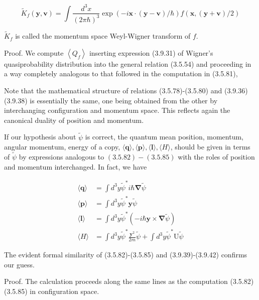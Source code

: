 \documentclass{article}
\begin{document}
\begin{equation*}
\tilde{K}_{f}(\boldsymbol{y}, \boldsymbol{v})=\int \frac{d^{3} x}{(2 \pi \hbar)^{3}} \exp (-i \boldsymbol{x} \cdot(\boldsymbol{y}-\boldsymbol{v}) / \hbar) f(\boldsymbol{x},(\boldsymbol{y}+\boldsymbol{v}) / 2) \tag{3.9.38}
\end{equation*}
 
$\tilde{K}_{f}$ is called the momentum space Weyl-Wigner transform of $f$.

Proof. We compute $\left\langle Q_{f}\right\rangle$ inserting expression (3.9.31) of Wigner's quasiprobability distribution into the general relation (3.5.54) and proceeding in a way completely analogous to that followed in the computation in (3.5.81),

Note that the mathematical structure of relations (3.5.78)-(3.5.80) and (3.9.36)(3.9.38) is essentially the same, one being obtained from the other by interchanging configuration and momentum space. This reflects again the canonical duality of position and momentum.

If our hypothesis about $\tilde{\psi}$ is correct, the quantum mean position, momentum, angular momentum, energy of a copy, $\langle\boldsymbol{q}\rangle,\langle\boldsymbol{p}\rangle,\langle\boldsymbol{l}\rangle,\langle H\rangle$, should be given in terms of $\tilde{\psi}$ by expressions analogous to $(3.5 .82)-(3.5 .85)$ with the roles of position and momentum interchanged. In fact, we have
 
\begin{align*}
\langle\boldsymbol{q}\rangle & =\int d^{3} y \tilde{\psi}^{*} i \hbar \boldsymbol{\nabla} \tilde{\psi}  \tag{3.9.39}\\
\langle\boldsymbol{p}\rangle & =\int d^{3} y \tilde{\psi}^{*} \boldsymbol{y} \tilde{\psi}  \tag{3.9.40}\\
\langle\boldsymbol{l}\rangle & =\int d^{3} y \tilde{\psi}^{*}(-i \hbar \boldsymbol{y} \times \boldsymbol{\nabla} \tilde{\psi})  \tag{3.9.41}\\
\langle H\rangle & =\int d^{3} y \tilde{\psi}^{*} \frac{\boldsymbol{y}^{2}}{2 m} \tilde{\psi}+\int d^{3} y \tilde{\psi}^{*} \mathrm{U} \tilde{\psi} \tag{3.9.42}
\end{align*}
 

The evident formal similarity of (3.5.82)-(3.5.85) and (3.9.39)-(3.9.42) confirms our guess.

Proof. The calculation proceeds along the same lines as the computation (3.5.82)(3.5.85) in configuration space.
\end{document}
